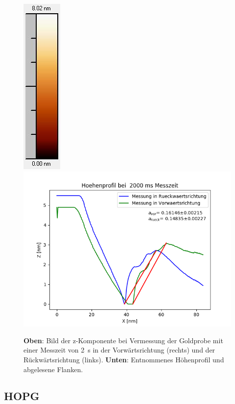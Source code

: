 \documentclass[12pt,a4paper]{article}
\begin{document}
\begin{figure}
\includegraphics[scale=0.6]{Bilder/Anhang/Zeit/2_Zeit_nach_Skala.jpg}
\includegraphics[scale=0.6]{Bilder/Anhang/Zeit/Profil_Zeit_2000.png}
\caption{\textbf{Oben}: Bild der z-Komponente bei Vermessung der Goldprobe mit einer Messzeit von \SI{2}{s} in der Vorwärtsrichtung (rechts) und der Rückwärtsrichtung (links). \textbf{Unten}: Entnommenes Höhenprofil und abgelesene Flanken.}
\end{figure}

\subsection{HOPG}
\end{document}
